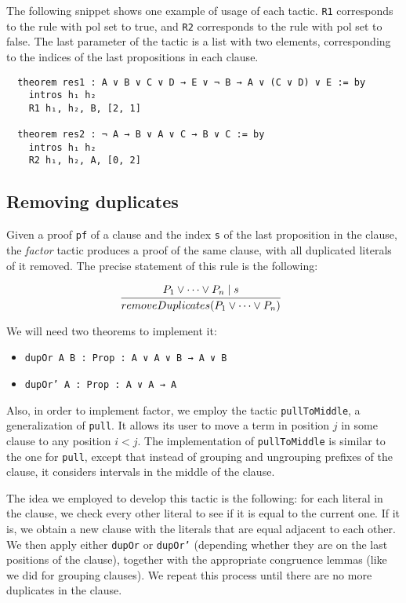 The following snippet shows one example of usage of each tactic. \texttt{R1} corresponds to
the rule with pol set to true, and \texttt{R2} corresponds to the rule with pol set to false.
The last parameter of the tactic is a list with two elements, corresponding to the indices
of the last propositions in each clause.

\begin{verbatim}
  theorem res1 : A ∨ B ∨ C ∨ D → E ∨ ¬ B → A ∨ (C ∨ D) ∨ E := by
    intros h₁ h₂
    R1 h₁, h₂, B, [2, 1]

  theorem res2 : ¬ A → B ∨ A ∨ C → B ∨ C := by
    intros h₁ h₂
    R2 h₁, h₂, A, [0, 2]
\end{verbatim}

\subsection{Removing duplicates}

Given a proof \texttt{pf} of a clause and the index \texttt{s} of the last proposition in the clause,
the \textit{factor} tactic produces a proof of the same clause, with all duplicated literals of it removed. The precise statement of this rule is the following:

\[
  \infer[]{removeDuplicates(P_{1} \vee \cdots \vee P_{n})}{P_{1} \vee \cdots \vee P_{n} \mid s}
\]

We will need two theorems to implement it:

\begin{itemize}
  \item \texttt{dupOr {A B : Prop} : A ∨ A ∨ B → A ∨ B}
  \item \texttt{dupOr' {A : Prop} : A ∨ A → A}
\end{itemize}

Also, in order to implement factor, we employ the tactic \texttt{pullToMiddle},
a generalization of \texttt{pull}. It allows its user to move a term in position $j$ in some clause to any position
$i < j$. The implementation of \texttt{pullToMiddle} is similar to the one for \texttt{pull}, except
that instead of grouping and ungrouping prefixes of the clause, it considers intervals in the middle of the clause.

The idea we employed to develop this tactic is the following: for each literal in the clause, we
check every other literal to see if it is equal to the current one. If it is, we obtain a new
clause with the literals that are equal adjacent to each other. We then apply either \texttt{dupOr}
or \texttt{dupOr'} (depending whether they are on the last positions of the clause), together
with the appropriate congruence lemmas (like we did for grouping clauses). We repeat this process
until there are no more duplicates in the clause.

